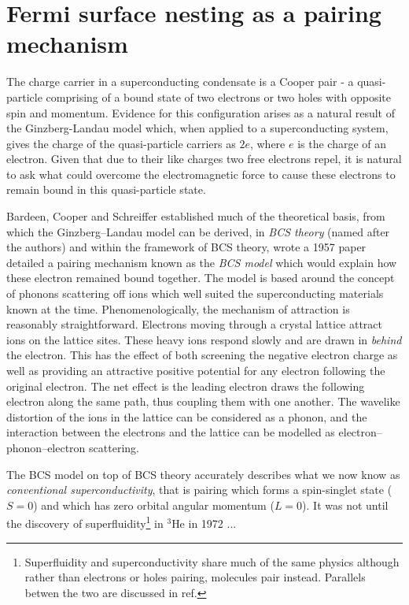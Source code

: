

\section{Fermi surface nesting as a pairing mechanism}

The charge carrier in a superconducting condensate is a Cooper pair - a quasi-particle comprising of a bound state of two electrons or two holes with opposite spin and momentum. Evidence for this configuration arises as a natural result of the Ginzberg-Landau model which, when applied to a superconducting system, gives the charge of the quasi-particle carriers as $2e$, where $e$ is the charge of an electron. Given that due to their like charges two free electrons repel, it is natural to ask what could overcome the electromagnetic force to cause these electrons to remain bound in this quasi-particle state.

Bardeen, Cooper and Schreiffer established much of the theoretical basis, from which the Ginzberg--Landau model can be derived, in \textit{BCS theory} (named after the authors) and within the framework of BCS theory, wrote a 1957 paper\cite{Bardeen1957} detailed a pairing mechanism known as the \textit{BCS model} which would explain how these electron remained bound together. The model is based around the concept of phonons scattering off ions which well suited the superconducting materials known at the time. Phenomenologically, the mechanism of attraction is reasonably straightforward. Electrons moving through a crystal lattice attract ions on the lattice sites. These heavy ions respond slowly and are drawn in \textit{behind} the electron. This has the effect of both screening the negative electron charge as well as providing an attractive positive potential for any electron following the original electron. The net effect is the leading electron draws the following electron along the same path, thus coupling them with one another. The wavelike distortion of the ions in the lattice can be considered as a phonon, and the interaction between the electrons and the lattice can be modelled as electron--phonon--electron scattering.

The BCS model on top of BCS theory accurately describes what we now know as \textit{conventional superconductivity}, that is pairing which forms a spin-singlet state ($S=0$) and which has zero orbital angular momentum ($L=0$). It was not until the discovery of superfluidity\footnote{Superfluidity and superconductivity share much of the same physics although rather than electrons or holes pairing, molecules pair instead. Parallels betwen the two are discussed in ref.\cite{Annett2010}} in $^3$He in 1972 ...

